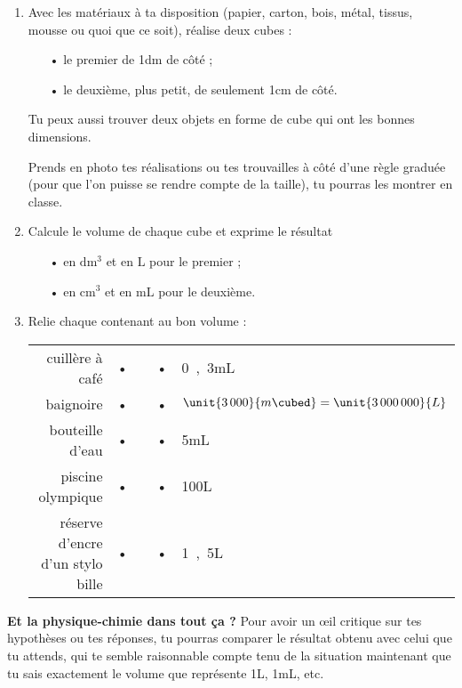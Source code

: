 \documentclass[12pt,a4paper]{article}
\begin{document}
\begin{enumerate}
\item Avec les matériaux à ta disposition (papier, carton, bois, métal, tissus, mousse ou quoi que ce soit), réalise deux cubes :
\begin{itemize}
\item[•] le premier de \unit{1}{dm} de côté ;
\item[•] le deuxième, plus petit, de seulement \unit{1}{cm} de côté.
\end{itemize}
Tu peux aussi trouver deux objets en forme de cube qui ont les bonnes dimensions.

Prends en photo tes réalisations ou tes trouvailles à côté d'une règle graduée (pour que l'on puisse se rendre compte de la taille), tu pourras les montrer en classe.

\item Calcule le volume de chaque cube et exprime le résultat 
\begin{itemize}
\item[•] en $\mathrm{dm^3}$ et en $\mathrm{L}$ pour le premier ;
\item[•] en $\mathrm{cm^3}$ et en $\mathrm{mL}$ pour le deuxième.
\end{itemize}

\item Relie chaque contenant au bon volume :
\begin{center}
\begin{tabular}{rc p{} c p{}}
cuillère à café & • && • & \unit{0{,}3}{mL} \\
baignoire & • && • & $\unit{3\,000}{m\cubed} = \unit{3\,000\,000}{L}$ \\
bouteille d'eau & • && • & \unit{5}{mL} \\
piscine olympique & • && • & \unit{100}{L} \\
réserve d'encre d'un stylo bille & • && • & \unit{1{,}5}{L} 
\end{tabular}
\end{center}
\end{enumerate}
\textbf{Et la physique-chimie dans tout ça ?}
Pour avoir un œil critique sur tes hypothèses ou tes réponses, tu pourras comparer le résultat obtenu avec celui que tu attends, qui te semble raisonnable compte tenu de la situation maintenant que tu sais exactement le volume que représente \unit{1}{L}, \unit{1}{mL}, etc. 
\end{document}
